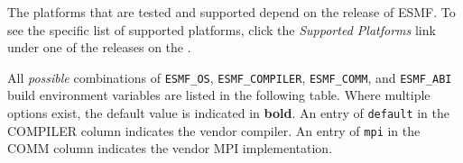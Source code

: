 

The platforms that are tested and supported depend on the release
of ESMF.  To see the specific list of supported platforms,
click the {\em Supported Platforms} link under one of the releases
on the .

All {\em possible} combinations of {\tt ESMF\_OS}, {\tt ESMF\_COMPILER}, {\tt ESMF\_COMM},
and {\tt ESMF\_ABI} build environment variables are listed in the following table.
Where multiple options exist, the default value is indicated in {\bf bold}.
An entry of {\tt default} in the COMPILER column indicates the vendor compiler.
An entry of {\tt mpi} in the COMM column indicates the vendor MPI implementation.

